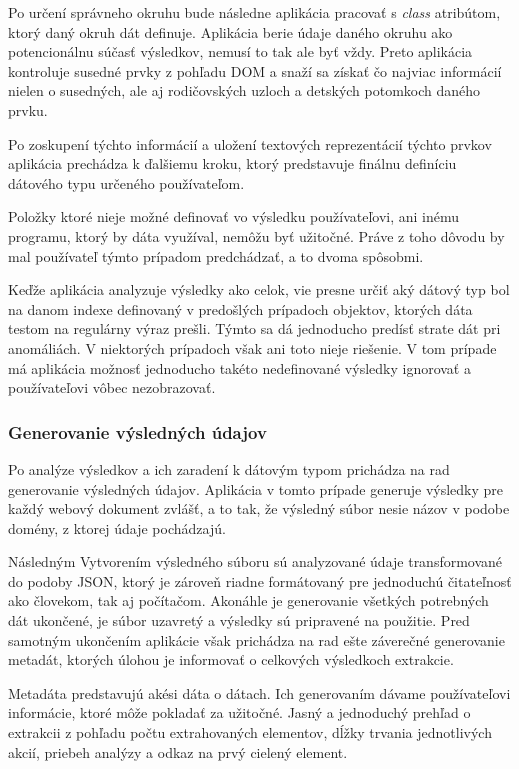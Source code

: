 Po určení správneho okruhu bude následne aplikácia pracovať s \textit{class} atribútom, ktorý daný okruh dát definuje. Aplikácia berie údaje daného okruhu ako potencionálnu súčasť výsledkov, nemusí to tak ale byť  vždy. Preto aplikácia kontroluje susedné prvky z pohľadu DOM a snaží sa získať čo najviac informácií nielen o susedných, ale aj rodičovských uzloch a detských potomkoch daného prvku.

Po zoskupení týchto informácií a uložení textových reprezentácií týchto prvkov aplikácia prechádza k ďalšiemu kroku, ktorý predstavuje finálnu definíciu  dátového typu určeného používateľom.

\bigskip

Položky ktoré nieje možné definovať vo výsledku používateľovi, ani inému programu, ktorý by dáta využíval, nemôžu byť užitočné. Práve z toho dôvodu by mal používateľ týmto prípadom predchádzať, a to dvoma spôsobmi. 

Keďže aplikácia analyzuje výsledky ako celok, vie presne určiť aký dátový typ bol na danom indexe definovaný v predošlých prípadoch objektov, ktorých dáta testom na regulárny výraz prešli. Týmto sa dá jednoducho predísť strate dát pri anomáliách. V niektorých prípadoch však ani toto nieje riešenie. V tom prípade má aplikácia možnosť jednoducho takéto nedefinované výsledky ignorovať a používateľovi vôbec nezobrazovať.

\subsubsection{Generovanie výsledných údajov}

Po analýze výsledkov a ich zaradení k dátovým typom prichádza na rad generovanie výsledných údajov. Aplikácia v tomto prípade generuje výsledky pre každý webový dokument zvlášť, a to tak, že výsledný súbor nesie názov v podobe domény, z ktorej údaje pochádzajú.

Následným Vytvorením výsledného súboru sú analyzované údaje transformované do podoby JSON, ktorý je zároveň riadne formátovaný pre jednoduchú čitateľnosť ako človekom, tak aj počítačom. Akonáhle je generovanie všetkých potrebných dát ukončené, je súbor uzavretý a výsledky sú pripravené na použitie. Pred samotným ukončením aplikácie však prichádza na rad ešte záverečné generovanie metadát, ktorých úlohou je informovať o celkových výsledkoch extrakcie.

Metadáta predstavujú akési dáta o dátach. Ich generovaním dávame používateľovi informácie, ktoré môže pokladať za užitočné. Jasný a jednoduchý prehľad o extrakcii z pohľadu počtu extrahovaných elementov, dĺžky trvania jednotlivých akcií, priebeh analýzy a odkaz na prvý cielený element.


